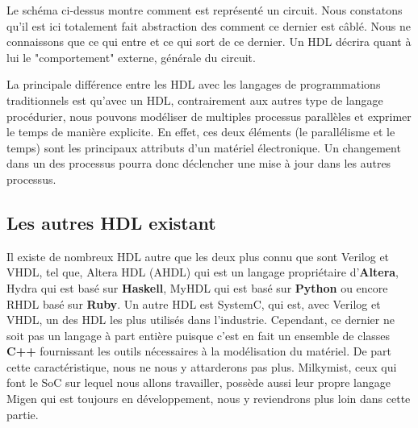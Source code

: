 Le schéma ci-dessus montre comment est représenté un circuit. Nous constatons qu'il est ici totalement fait abstraction des comment ce dernier est câblé. Nous ne connaissons que ce qui entre et ce qui sort de ce dernier. Un HDL décrira quant à lui le "comportement" externe, générale du circuit.

La principale différence entre les HDL avec les langages de programmations traditionnels est qu'avec un HDL, contrairement aux autres type de langage procédurier, nous pouvons modéliser de multiples processus parallèles et exprimer le temps de manière explicite. En effet, ces deux éléments (le parallélisme et le temps) sont les principaux attributs d'un matériel électronique. Un changement dans un des processus pourra donc déclencher une mise à jour dans les autres processus.

\subsection{Les autres HDL existant}
\vspace{15px}
Il existe de nombreux HDL autre que les deux plus connu que sont Verilog et VHDL, tel que, Altera HDL (AHDL) qui est un langage propriétaire d'\textbf{Altera}, Hydra qui est basé sur \textbf{Haskell}, MyHDL qui est basé sur \textbf{Python} ou encore RHDL basé sur \textbf{Ruby}. Un autre HDL est SystemC, qui est, avec Verilog et VHDL, un des HDL les plus utilisés dans l'industrie. Cependant, ce dernier ne soit pas un langage à part entière puisque c'est en fait un ensemble de classes \textbf{C++} fournissant les outils nécessaires à la modélisation du matériel. De part cette caractéristique, nous ne nous y attarderons pas plus. Milkymist, ceux qui font le SoC sur lequel nous allons travailler, possède aussi leur propre langage Migen qui est toujours en développement, nous y reviendrons plus loin dans cette partie.

